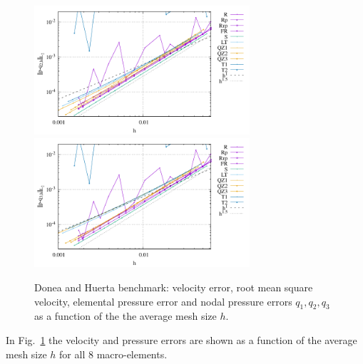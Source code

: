 \documentclass[a4paper,12pt]{article}
\begin{document}
\begin{figure}
\includegraphics[width=8cm]{../results/errors_q2_exp1}
\includegraphics[width=8cm]{../results/errors_q3_exp1}
\caption{Donea and Huerta benchmark: velocity error, 
root mean square velocity, elemental pressure error and nodal pressure errors $q_1,q_2,q_3$
as a function of the the average mesh size $h$.} 
\label{fig:resdh}
\end{figure}

In Fig.~\ref{fig:resdh} the velocity and pressure errors are shown as a function of the 
average mesh size $h$ for all 8 macro-elements.
\end{document}
